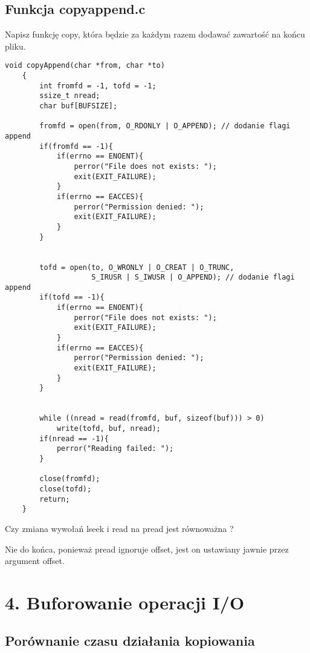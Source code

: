 \documentclass[a4paper,15pt]{article}
\newcommand{\ask}[2]{
    \begin{tcolorbox}[colback=black!5!white,colframe=gray,title={Pytanie #1}]
        #2
    \end{tcolorbox}
}
\newcommand{\assignment}[2]{
    \begin{tcolorbox}[colback=black!5!white,colframe=black,title={Zadanie #1}]
        #2
    \end{tcolorbox}
}
\begin{document}
\subsection{Funkcja copyappend.c}
\assignment{}{
Napisz funkcję copy, która będzie za każdym razem dodawać zawartość na końcu pliku.
}

\begin{lstlisting}[style=CStyle, label=some-code, caption=copyappend.c]
void copyAppend(char *from, char *to) 
    {
    	int fromfd = -1, tofd = -1;
    	ssize_t nread;
    	char buf[BUFSIZE];
     
    	fromfd = open(from, O_RDONLY | O_APPEND); // dodanie flagi append
    	if(fromfd == -1){
            if(errno == ENOENT){
                perror("File does not exists: ");
                exit(EXIT_FAILURE);
            }
            if(errno == EACCES){
                perror("Permission denied: ");
                exit(EXIT_FAILURE);
            }
        }

        
        tofd = open(to, O_WRONLY | O_CREAT | O_TRUNC,
    				S_IRUSR | S_IWUSR | O_APPEND); // dodanie flagi append
        if(tofd == -1){
            if(errno == ENOENT){
                perror("File does not exists: ");
                exit(EXIT_FAILURE);
            }
            if(errno == EACCES){
                perror("Permission denied: ");
                exit(EXIT_FAILURE);
            }
        }


    	while ((nread = read(fromfd, buf, sizeof(buf))) > 0)
    	    write(tofd, buf, nread);	
        if(nread == -1){
            perror("Reading failed: ");
        }
            
        close(fromfd);
    	close(tofd);
    	return;
    }

\end{lstlisting}

\ask{}{
Czy zmiana wywołań lseek i read na pread jest równoważna ? 
} 
Nie do końca, ponieważ pread ignoruje offset, jest on ustawiany jawnie przez argument offset.


\section{4. Buforowanie operacji I/O}

\subsection{Porównanie czasu działania kopiowania}
\end{document}
